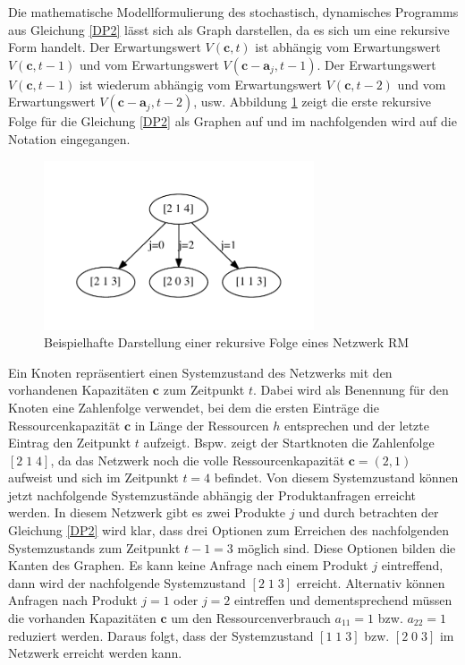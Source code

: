 Die mathematische Modellformulierung des stochastisch, dynamisches Programms aus Gleichung \eqref{DP2} lässt sich als Graph darstellen, da es sich um eine rekursive Form handelt. Der Erwartungswert $V(\textbf{c},t)$ ist abhängig vom Erwartungswert $V(\textbf{c},t-1)$ und vom Erwartungswert $V(\textbf{c}-\textbf{a}_{j},t-1)$. Der Erwartungswert $V(\textbf{c},t-1)$ ist wiederum abhängig vom Erwartungswert $V(\textbf{c},t-2)$ und vom Erwartungswert $V(\textbf{c}-\textbf{a}_{j},t-2)$, usw. Abbildung \ref{B0} zeigt die erste rekursive Folge für die Gleichung \eqref{DP2} als Graphen auf und im nachfolgenden wird auf die Notation eingegangen.
\begin{figure}[h!]
  \begin{center}
    \includegraphics[width=80mm]{Bilder/Beispiel0.pdf}
    \caption{Beispielhafte Darstellung einer rekursive Folge eines Netzwerk RM}  \label{B0}
  \end{center}
\end{figure}
Ein Knoten repräsentiert einen Systemzustand des Netzwerks mit den vorhandenen Kapazitäten $\textbf{c}$ zum Zeitpunkt $t$. Dabei wird als Benennung für den Knoten eine Zahlenfolge verwendet, bei dem die ersten Einträge die Ressourcenkapazität $\textbf{c}$ in Länge der Ressourcen $h$ entsprechen und der letzte Eintrag den Zeitpunkt $t$ aufzeigt. Bspw. zeigt der Startknoten die Zahlenfolge $[2\;1\;4]$, da das Netzwerk noch die volle Ressourcenkapazität $\textbf{c}=(2,1)$ aufweist und sich im Zeitpunkt $t=4$ befindet. Von diesem Systemzustand können jetzt nachfolgende Systemzustände abhängig der Produktanfragen erreicht werden. In diesem Netzwerk gibt es zwei Produkte $j$ und durch betrachten der Gleichung \eqref{DP2} wird klar, dass drei Optionen zum Erreichen des nachfolgenden Systemzustands zum Zeitpunkt $t-1=3$ möglich sind. Diese Optionen bilden die Kanten des Graphen. Es kann keine Anfrage nach einem Produkt $j$ eintreffend, dann wird der nachfolgende Systemzustand $[2\;1\;3]$ erreicht. Alternativ können Anfragen nach Produkt $j=1$ oder $j=2$ eintreffen und dementsprechend müssen die vorhanden Kapazitäten $\textbf{c}$ um den Ressourcenverbrauch $a_{11}=1$ bzw. $a_{22}=1$ reduziert werden. Daraus folgt, dass der Systemzustand $[1\;1\;3]$ bzw. $[2\;0\;3]$ im Netzwerk erreicht werden kann.

